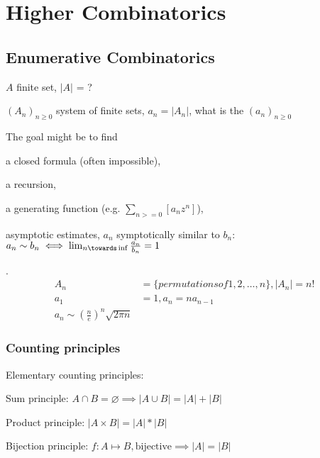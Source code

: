 

\chapter{Higher Combinatorics}

\section{Enumerative Combinatorics}

$A$ finite set, $|A|$ = ?

$(A_n)_{n ≥ 0}$ system of finite sets, $a_n = |A_n|$, what is the  $(a_n)_{n ≥ 0}$

The goal might be to find
\begin{compactitem}
\item a closed formula (often impossible),
\item a recursion,
\item a generating function (e.g. $\sum_{n >= 0}[a_n z^n]$),
\item asymptotic estimates, $a_n$ symptotically similar to $b_n$:
    $a_n \sim b_n \iff \lim_{n\towards\inf} \frac{a_n}{b_n} = 1$
\end{compactitem}


\Example.
\begin{align*}
A_n &= \{permutations of 1,2, \ldots, n\}, |A_n| = n! \\
a_1 &= 1, a_n = n a_{n-1} \\
a_n \sim (\frac{n}{e})^n \sqrt{2\pi n}
\end{align*}


\subsection{Counting principles}

Elementary counting principles:
\begin{compactenum}
\item Sum principle:
    $A\cap B = \varnothing \implies |A\cup B| = |A| + |B|$
\item Product principle:
    $|A\times B| = |A| * |B|$
\item Bijection principle:
    $f: A\mapsto B, \text{bijective}\implies |A| = |B|$
\end{compactenum}

